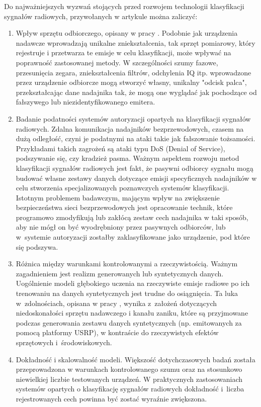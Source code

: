 Do najważniejszych wyzwań stojących przed rozwojem technologii klasyfikacji sygnałów radiowych, przywołanych w artykule \cite{soltani2021RF} można zaliczyć:
\begin{enumerate}
    \item Wpływ sprzętu odbiorczego, opisany w pracy \cite{yang2024mitigatingreceiverimpactradio}. Podobnie jak urządzenia nadawcze wprowadzają unikalne zniekształcenia, tak sprzęt pomiarowy, który rejestruje i przetwarza te emisje w celu klasyfikacji, może wpływać na poprawność zastosowanej metody. W szczególności szumy fazowe, przesunięcia zegara, zniekształcenia filtrów, odchylenia IQ itp. wprowadzone przez urządzenie odbiorcze mogą stworzyć własny, unikalny "odcisk palca", przekształcając dane nadajnika tak, że mogą one wyglądać jak pochodzące od fałszywego lub niezidentyfikowanego emitera.
    \item Badanie podatności systemów autoryzacji opartych na klasyfikacji sygnałów radiowych. Zdalna komunikacja nadajników bezprzewodowych, czasem na dużą odległość, czyni je podatnymi na ataki takie jak fałszowanie tożsamości. Przykładami takich zagrożeń są ataki typu DoS (Denial of Service), podszywanie się, czy kradzież pasma. Ważnym aspektem rozwoju metod klasyfikacji sygnałów radiowych jest fakt, że pasywni odbiorcy sygnału mogą budować własne zestawy danych dotyczące emisji specyficznych nadajników w celu stworzenia specjalizowanych poznawczych systemów klasyfikacji. Istotnym problemem badawczym, mającym wpływ na zwiększenie bezpieczeństwa sieci bezprzewodowych jest opracowanie technik, które programowo zmodyfikują lub zakłócą zestaw cech nadajnika w taki sposób, aby nie mógł on być wyodrębniony przez pasywnych odbiorców, lub w~systemie autoryzacji zostałby zaklasyfikowane jako urządzenie, pod które się podszywa.
    \item Różnica między warunkami kontrolowanymi a rzeczywistością. Ważnym zagadnieniem jest realizm generowanych lub syntetycznych danych. Uogólnienie modeli głębokiego uczenia na rzeczywiste emisje radiowe po ich trenowaniu na danych syntetycznych jest trudne do osiągnięcia. Ta luka w~zdolnościach, opisana w pracy \cite{O_Shea_2018}, wynika z~założeń dotyczących niedoskonałości sprzętu nadawczego i kanału zaniku, które są przyjmowane podczas generowania zestawu danych syntetycznych (np. emitowanych za pomocą platformy USRP), w kontraście do rzeczywistych efektów sprzętowych i~środowiskowych.
    \item Dokładność i skalowalność modeli. Większość dotychczasowych badań została przeprowadzona w warunkach kontrolowanego szumu oraz na stosunkowo niewielkiej liczbie testowanych urządzeń. W praktycznych zastosowaniach systemów opartych o klasyfikację sygnałów radiowych dokładność i~liczba rejestrowanych cech powinna być zostać wyraźnie zwiększona.
\end{enumerate}

